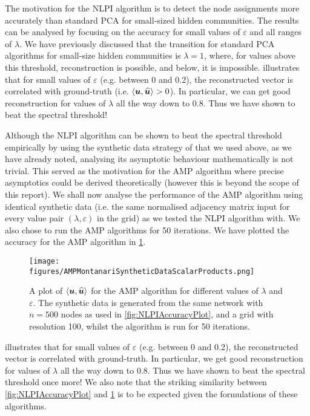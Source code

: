 The motivation for the NLPI algorithm is to detect the node assignments more accurately than standard PCA for small-sized hidden communities. The results can be analysed by focusing on the accuracy for small values of $\varepsilon$ and all ranges of $\lambda$.
We have previously discussed that the transition for standard PCA algorithms for small-size hidden communities is $\lambda = 1$, where, for values above this threshold, reconstruction is possible, and below, it is impossible.
 illustrates that for small values of $\varepsilon$ (e.g. between 0 and 0.2), the reconstructed vector is correlated with ground-truth (i.e. $\innerP{\vecvar{u},\widehat{\vecvar{u}}} > 0$).
In particular, we can get good reconstruction for values of $\lambda$ all the way down to 0.8. Thus we have shown to beat the spectral threshold!

Although the NLPI algorithm can be shown to beat the spectral threshold empirically by using the synthetic data strategy of \cite{Mon13}  that we used above, as we have already noted, analysing its asymptotic behaviour mathematically is not trivial.
This served as the motivation for the AMP algorithm where precise asymptotics could be derived theoretically (however this is beyond the scope of this report).
We shall now analyse the performance of the AMP algorithm using identical synthetic data (i.e. the same normalised adjacency matrix input for every value pair $(\lambda,\varepsilon)$ in the grid) as we tested the NLPI algorithm with. We also chose to run the AMP algorithms for 50 iterations.
We have plotted the accuracy for the AMP algorithm in \cref{fig:AMPAccuracyPlot}.


\begin{figure}
	\centering
	\texttt{[image: figures/AMPMontanariSyntheticDataScalarProducts.png]}
	\caption[Plot of accuracy for AMP algorithm.]{\label{fig:AMPAccuracyPlot} A plot of $\innerP{\vecvar{u},\widehat{\vecvar{u}}}$ for the AMP algorithm for different values of $\lambda$ and $\varepsilon$. The synthetic data is generated from the same network with $n=500$ nodes as used in \cref{fig:NLPIAccuracyPlot}, and a grid with resolution 100, whilst the algorithm is run for 50 iterations.}
\end{figure}

 illustrates that for small values of $\varepsilon$ (e.g. between 0 and 0.2), the reconstructed vector is correlated with ground-truth.
In particular, we get good reconstruction for values of $\lambda$ all the way down to 0.8. Thus we have shown to beat the spectral threshold once more!
We also note that the striking similarity between \cref{fig:NLPIAccuracyPlot} and \cref{fig:AMPAccuracyPlot} is to be expected given the formulations of these algorithms.

